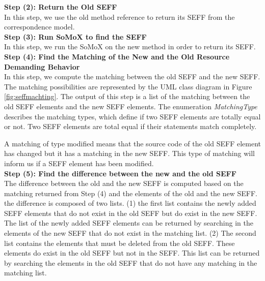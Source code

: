 \textbf{Step (2): Return the Old SEFF}\\
In this step, we use the old method reference to return its SEFF from the correspondence model.\\

\textbf{Step (3): Run SoMoX to find the SEFF}\\
In this step, we run the SoMoX on the new method in order to return its SEFF. \\

\textbf{Step (4): Find the Matching of the New and the Old Resource Demanding Behavior}\\
In this step, we compute the matching between the old SEFF and the new SEFF. The matching possibilities are represented by the UML class diagram in Figure \ref{fig:seffmachting}.  The output of this step is a list of the matching between the old SEFF elements and the new SEFF elements. The enumeration \textit{MatchingType} describes the matching types, which define if two SEFF elements are totally equal or not. Two SEFF elements are total equal if their statements match completely. 

A matching of type modified means that the source code of the old SEFF element has changed but it has a matching in the new SEFF. This type of matching will inform us if a SEFF element has been modified.\\

\textbf{Step (5): Find the difference between the new and the old SEFF}\\
The difference between the old and the new SEFF is computed based on the matching returned from
Step (4) and the elements of the old and the new SEFF. the difference is composed of two lists. (1) the first list contains the newly added SEFF elements that do not exist in the old SEFF but do exist in the new SEFF. The list of the newly added SEFF elements can be returned by searching in the elements of the new SEFF that do not exist in the matching list.  (2) The second list contains the elements that must be deleted from the old SEFF. These elements do exist in the old SEFF but not in the SEFF. This list can be returned by searching the elements in the old SEFF that do not have any matching in the matching list.\\

